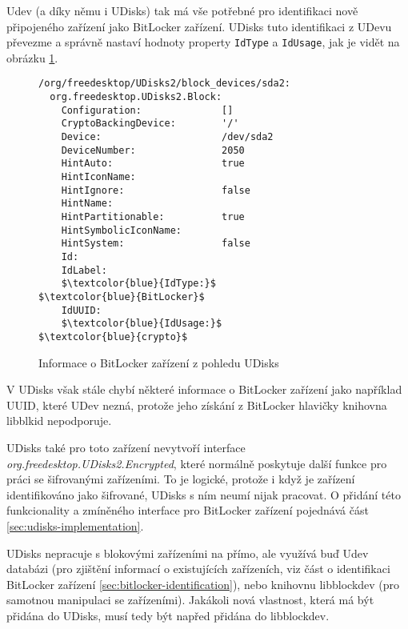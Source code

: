 Udev (a díky němu i UDisks) tak má vše potřebné pro identifikaci nově připojeného zařízení jako BitLocker zařízení. UDisks tuto identifikaci z UDevu převezme a správně nastaví hodnoty property \texttt{IdType} a \texttt{IdUsage}, jak je vidět na obrázku \ref{fig:udisks-bitlocker-without-support}.

\begin{figure}[h]
		\centering
		\captionsetup{width=0.65\linewidth}
\begin{center}
\centering
\begin{lstlisting}[frame=none, escapechar=$, basicstyle=\ttfamily\small, columns=fullflexible, keepspaces=true, xleftmargin=.2\textwidth, xrightmargin=.2\textwidth]
/org/freedesktop/UDisks2/block_devices/sda2:
  org.freedesktop.UDisks2.Block:
    Configuration:              []
    CryptoBackingDevice:        '/'
    Device:                     /dev/sda2
    DeviceNumber:               2050
    HintAuto:                   true
    HintIconName:
    HintIgnore:                 false
    HintName:
    HintPartitionable:          true
    HintSymbolicIconName:
    HintSystem:                 false
    Id:
    IdLabel:
    $\textcolor{blue}{IdType:}$                     $\textcolor{blue}{BitLocker}$
    IdUUID:
    $\textcolor{blue}{IdUsage:}$                    $\textcolor{blue}{crypto}$
\end{lstlisting}
\end{center}
		\caption{Informace o BitLocker zařízení z pohledu UDisks}
		\label{fig:udisks-bitlocker-without-support}
\end{figure}

V UDisks však stále chybí některé informace o BitLocker zařízení jako například UUID, které UDev nezná, protože jeho získání z BitLocker hlavičky knihovna libblkid nepodporuje.

UDisks také pro toto zařízení nevytvoří interface \emph{org.freedesktop.UDisks2.Encrypted}, které normálně poskytuje další funkce pro práci se šifrovanými zařízeními. To je logické, protože i když je zařízení identifikováno jako šifrované, UDisks s ním neumí nijak pracovat. O přidání této funkcionality a zmíněného interface pro BitLocker zařízení pojednává část \ref{sec:udisks-implementation}.

\label{sec:libblockdev}

UDisks nepracuje s blokovými zařízeními na přímo, ale využívá buď Udev databázi (pro zjištění informací o existujících zařízeních, viz část o identifikaci BitLocker zařízení \ref{sec:bitlocker-identification}), nebo knihovnu libblockdev (pro samotnou manipulaci se zařízeními)\cite{Podzimek2017}. Jakákoli nová vlastnost, která má být přidána do UDisks, musí tedy být napřed přidána do libblockdev.

